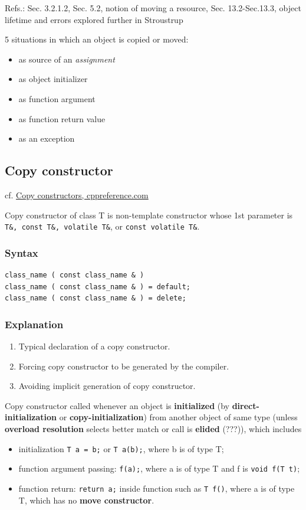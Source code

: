 \documentclass[10pt]{amsart}
\begin{document}
Refs.: Sec. 3.2.1.2, Sec. 5.2, notion of moving a resource, Sec. 13.2-Sec.13.3, object lifetime and errors explored further in Stroustrup \cite{Stro2013}  


5 situations in which an object is copied or moved:   
\begin{itemize}
	\item as source of an \emph{assignment}
	\item as object initializer 
	\item as function argument
	\item as function return value
	\item as an exception  
\end{itemize}

\subsection{Copy constructor}

cf. \href{http://en.cppreference.com/w/cpp/language/copy_constructor}{Copy constructors, cppreference.com}

Copy constructor of class T is non-template constructor whose 1st parameter is \verb|T&, const T&, volatile T&|, or \verb|const volatile T&|.  

\subsubsection{Syntax}  

\begin{lstlisting}
class_name ( const class_name & )  
class_name ( const class_name & ) = default;  
class_name ( const class_name & ) = delete;
\end{lstlisting}  

\subsubsection{Explanation}  
\begin{enumerate}
	\item Typical declaration of a copy constructor.  
	\item Forcing copy constructor to be generated by the compiler.  
	\item Avoiding implicit generation of copy constructor.  
\end{enumerate}


Copy constructor called whenever an object is \textbf{initialized} (by \textbf{direct-initialization} or \textbf{copy-initialization}) from another object of same type (unless \textbf{overload resolution} selects better match or call is \textbf{elided} (???)), which includes  
\begin{itemize}
	\item initialization \verb|T a = b;| or \verb|T a(b);|, where b is of type T;  
	\item function argument passing: \verb|f(a);|, where a is of type T and f is \verb|void f(T t)|;  
	\item function return: \verb|return a;| inside function such as \verb|T f()|, where a is of type T, which has no \textbf{move constructor}.   
\end{itemize}
\end{document}
